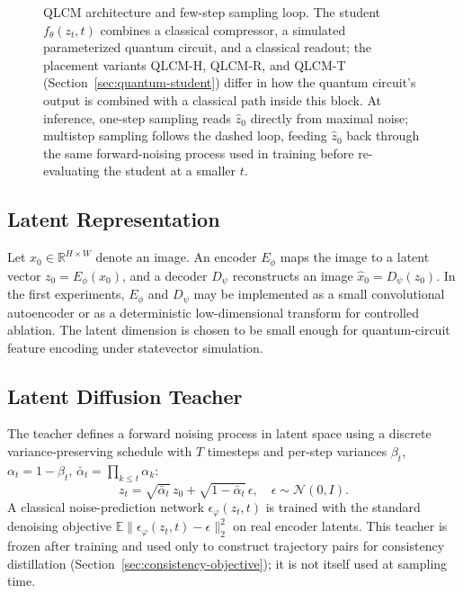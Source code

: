 \documentclass[11pt]{article}
\begin{document}
\begin{figure}[t]
\begin{tikzpicture}
\end{tikzpicture}
\caption{QLCM architecture and few-step sampling loop. The student
$f_\theta(z_t,t)$ combines a classical compressor, a simulated parameterized
quantum circuit, and a classical readout; the placement variants QLCM-H,
QLCM-R, and QLCM-T (Section~\ref{sec:quantum-student}) differ in how the
quantum circuit's output is combined with a classical path inside this
block. At inference, one-step sampling reads $\hat{z}_0$ directly from
maximal noise; multistep sampling follows the dashed loop, feeding
$\hat{z}_0$ back through the same forward-noising process used in training
before re-evaluating the student at a smaller $t$.}
\label{fig:architecture}
\end{figure}

\subsection{Latent Representation}

Let $x_0 \in \mathbb{R}^{H \times W}$ denote an image. An encoder
$E_\phi$ maps the image to a latent vector $z_0 = E_\phi(x_0)$, and a decoder
$D_\psi$ reconstructs an image $\hat{x}_0 = D_\psi(z_0)$. In the first
experiments, $E_\phi$ and $D_\psi$ may be implemented as a small convolutional
autoencoder or as a deterministic low-dimensional transform for controlled
ablation. The latent dimension is chosen to be small enough for quantum-circuit
feature encoding under statevector simulation.

\subsection{Latent Diffusion Teacher}
\label{sec:teacher}

The teacher defines a forward noising process in latent space using a
discrete variance-preserving schedule with $T$ timesteps and per-step
variances $\beta_t$, $\alpha_t = 1-\beta_t$, $\bar\alpha_t=\prod_{k\le t}\alpha_k$:
\begin{equation}
    z_t = \sqrt{\bar\alpha_t}\, z_0 + \sqrt{1-\bar\alpha_t}\,\epsilon,\quad
    \epsilon \sim \mathcal{N}(0, I).
    \label{eq:forward-noise}
\end{equation}
A classical noise-prediction network $\epsilon_\varphi(z_t,t)$ is trained with
the standard denoising objective $\mathbb{E}\|\epsilon_\varphi(z_t,t)-\epsilon\|_2^2$
on real encoder latents. This teacher is frozen after training and used only
to construct trajectory pairs for consistency distillation
(Section~\ref{sec:consistency-objective}); it is not itself used at sampling
time.
\end{document}
